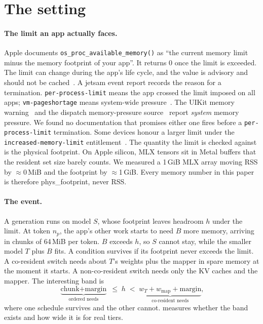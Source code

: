 \section{The setting}\label{sec:problem}

\paragraph{The limit an app actually faces.}
Apple documents \texttt{os\_proc\_available\_memory()} as ``the current memory limit minus the memory footprint of your app''.
It returns 0 once the limit is exceeded.
The limit can change during the app's life cycle, and the value is advisory and should not be cached~\citep{apple_os_proc_available_memory}.
A jetsam event report records the reason for a termination.
\texttt{per-process-limit} means the app crossed the limit imposed on all apps; \texttt{vm-pageshortage} means system-wide pressure~\citep{apple_jetsam}.
The UIKit memory warning~\citep{apple_memwarning} and the dispatch memory-pressure source~\citep{apple_pressure_source} report \emph{system} memory pressure.
We found no documentation that promises either one fires before a \texttt{per-process-limit} termination.
Some devices honour a larger limit under the \texttt{increased-memory-limit} entitlement~\citep{apple_increased_limit}.
The quantity the limit is checked against is the physical footprint.
On Apple silicon, MLX tensors sit in Metal buffers that the resident set size barely counts.
We measured a 1\,GiB MLX array moving RSS by $\approx$0\,MiB and the footprint by $\approx$1\,GiB.
Every memory number in this paper is therefore phys\_footprint, never RSS.

\paragraph{The event.}
A generation runs on model $S$, whose footprint leaves headroom $h$ under the limit.
At token $n_p$, the app's other work starts to need $B$ more memory, arriving in chunks of 64\,MiB per token.
$B$ exceeds $h$, so $S$ cannot stay, while the smaller model $T$ plus $B$ fits.
A condition survives if its footprint never exceeds the limit.
A co-resident switch needs about $T$'s weights plus the mapper in spare memory at the moment it starts.
A non-co-resident switch needs only the KV caches and the mapper.
The interesting band is
\[
  \underbrace{\text{chunk} + \text{margin}}_{\text{ordered needs}} \;\le\; h \;<\; \underbrace{w_T + w_{\text{map}} + \text{margin}}_{\text{co-resident needs}},
\]
where one schedule survives and the other cannot.
 measures whether the band exists and how wide it is for real tiers.
